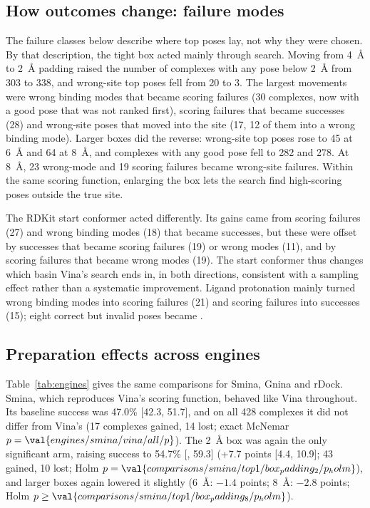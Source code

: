 \subsection{How outcomes change: failure modes}

The failure classes below describe where top poses lay, not why they were chosen. By that
description, the tight box acted mainly through search. Moving from \SI{4}{\angstrom} to
\SI{2}{\angstrom} padding raised the number of complexes with any pose below
\SI{2}{\angstrom} from 303 to 338, and wrong-site top poses fell from 20 to 3. The largest
movements were wrong binding modes that became scoring failures (30 complexes, now with a
good pose that was not ranked first), scoring failures that became successes (28) and
wrong-site poses that moved into the site (17, 12 of them into a wrong binding mode). Larger boxes did the reverse: wrong-site top
poses rose to 45 at \SI{6}{\angstrom} and 64 at \SI{8}{\angstrom}, and complexes with any
good pose fell to 282 and 278. At \SI{8}{\angstrom}, 23 wrong-mode and 19 scoring failures
became wrong-site failures. Within the same scoring function, enlarging the box lets the
search find high-scoring poses outside the true site.

The RDKit start conformer acted differently. Its gains came from scoring failures (27) and
wrong binding modes (18) that became successes, but these were offset by successes that
became scoring failures (19) or wrong modes (11), and by scoring failures that became wrong
modes (19). The start conformer thus changes which basin Vina's search ends in, in both
directions, consistent with a sampling effect rather than a systematic improvement.
Ligand protonation mainly turned wrong binding modes into scoring failures (21) and scoring
failures into successes (15); eight correct but invalid poses became \pbvalid{}.

\subsection{Preparation effects across engines}

Table~\ref{tab:engines} gives the same comparisons for Smina, Gnina and rDock. Smina, which reproduces Vina's scoring function, behaved like Vina
throughout. Its baseline success was 47.0\% [42.3, 51.7], and on all 428 complexes it did
not differ from Vina's (17 complexes gained, 14 lost; exact McNemar $p = \val{engines/smina/vina/all/p}$). The
\SI{2}{\angstrom} box was again the only significant arm, raising success to 54.7\%
[, 59.3] (+7.7 points [4.4, 10.9]; 43 gained, 10 lost; Holm $p = \val{comparisons/smina/top1/box_padding_2/p_holm}$), and larger
boxes again lowered it slightly (\SI{6}{\angstrom}: $-1.4$ points; \SI{8}{\angstrom}:
$-2.8$ points; Holm $p \ge \val{comparisons/smina/top1/box_padding_8/p_holm}$).

